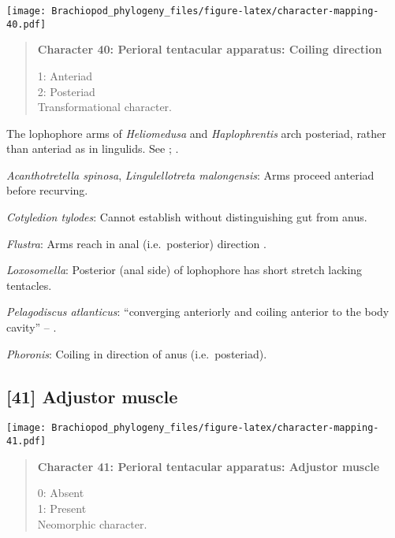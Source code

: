 \documentclass[openany]{book}
\theoremstyle{definition}
\theoremstyle{definition}
\theoremstyle{definition}
\theoremstyle{remark}
\begin{document}
\texttt{[image: Brachiopod\_phylogeny\_files/figure-latex/character-mapping-40.pdf]}

\begin{quote}
\textbf{Character 40: Perioral tentacular apparatus: Coiling direction}

1: Anteriad\\
2: Posteriad\\
Transformational character.
\end{quote}

The lophophore arms of \emph{Heliomedusa} and \emph{Haplophrentis} arch
posteriad, rather than anteriad as in lingulids. See
\citet{Zhang2009Architectureand}; \citet{Moysiuk2017Hyolithsare}.

\hypertarget{Acanthotretella_spinosa-coding-40}{}
\emph{Acanthotretella spinosa}, \emph{Lingulellotreta malongensis}: Arms
proceed anteriad before recurving.

\hypertarget{Cotyledion_tylodes-coding-40}{}
\emph{Cotyledion tylodes}: Cannot establish without distinguishing gut
from anus.

\hypertarget{Flustra-coding-40}{}
\emph{Flustra}: Arms reach in anal (i.e.~posterior) direction
\citep{Shunkina2015}.

\hypertarget{Loxosomella-coding-40}{}
\emph{Loxosomella}: Posterior (anal side) of lophophore has short
stretch lacking tentacles.

\hypertarget{Pelagodiscus_atlanticus-coding-40}{}
\emph{Pelagodiscus atlanticus}: ``converging anteriorly and coiling
anterior to the body cavity'' -- \citet{Zhang2009Architectureand}.

\hypertarget{Phoronis-coding-40}{}
\emph{Phoronis}: Coiling in direction of anus (i.e.~posteriad).

\subsection*{{[}41{]} Adjustor muscle}\label{adjustor-muscle}

\texttt{[image: Brachiopod\_phylogeny\_files/figure-latex/character-mapping-41.pdf]}

\begin{quote}
\textbf{Character 41: Perioral tentacular apparatus: Adjustor muscle}

0: Absent\\
1: Present\\
Neomorphic character.
\end{quote}
\end{document}
